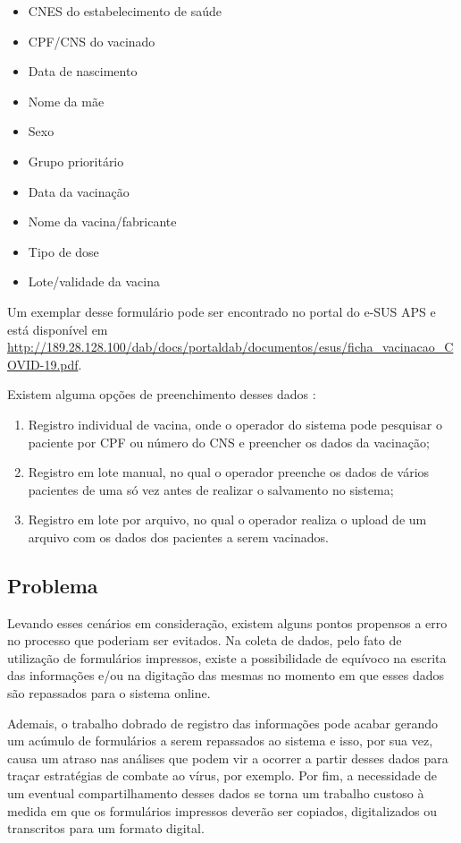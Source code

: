 \begin{itemize}
  \item CNES do estabelecimento de saúde
  \item CPF/CNS do vacinado
  \item Data de nascimento
  \item Nome da mãe
  \item Sexo
  \item Grupo prioritário
  \item Data da vacinação
  \item Nome da vacina/fabricante
  \item Tipo de dose
  \item Lote/validade da vacina
\end{itemize}

Um exemplar desse formulário pode ser encontrado no portal do e-SUS APS e está disponível em \url{http://189.28.128.100/dab/docs/portaldab/documentos/esus/ficha_vacinacao_COVID-19.pdf}.

Existem alguma opções de preenchimento desses dados \cite{roteiro2021sipni}:
\begin{enumerate}[label=\textbf{\roman*}]
  \item Registro individual de vacina, onde o operador do sistema pode pesquisar o paciente por CPF ou número do CNS e preencher os dados da vacinação;
  \item Registro em lote manual, no qual o operador preenche os dados de vários pacientes de uma só vez antes de realizar o salvamento no sistema;
  \item Registro em lote por arquivo, no qual o operador realiza o upload de um arquivo com os dados dos pacientes a serem vacinados.
\end{enumerate}


\subsection{Problema}
\label{cap1:SubSec:Problema}

Levando esses cenários em consideração, existem alguns pontos propensos a erro no processo que poderiam ser evitados. Na coleta de dados, pelo fato de utilização de formulários impressos, existe a possibilidade de equívoco na escrita das informações e/ou na digitação das mesmas no momento em que esses dados são repassados para o sistema online.

Ademais, o trabalho dobrado de registro das informações pode acabar gerando um acúmulo de formulários a serem repassados ao sistema e isso, por sua vez, causa um atraso nas análises que podem vir a ocorrer a partir desses dados para traçar estratégias de combate ao vírus, por exemplo. Por fim, a necessidade de um eventual compartilhamento desses dados se torna um trabalho custoso à medida em que os formulários impressos deverão ser copiados, digitalizados ou transcritos para um formato digital.

